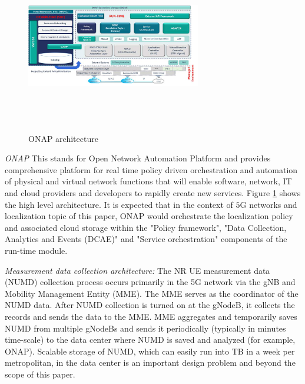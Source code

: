 \documentclass[conference, 10pt]{IEEEtran}
\begin{document}
\begin{figure}[t]
\begin{center}
\includegraphics[height=3.0in,width=3.0in]{./ONAP-architecture.png}
\caption{\label{fig:onap_arch}
{\small ONAP architecture}}
\end{center}
\end{figure}



{\em ONAP} This stands for Open Network Automation Platform and provides comprehensive platform for real time policy driven orchestration and automation of physical and virtual network functions that will enable software, network,
IT and cloud providers and developers to rapidly create new services. Figure \ref{fig:onap_arch} shows the high level architecture. It is expected that in the context of $5$G networks and localization topic of this paper, ONAP would orchestrate the localization policy and associated cloud storage within the "Policy framework", "Data Collection, Analytics and Events (DCAE)" and "Service orchestration" components of the run-time module. 

{\em Measurement data collection architecture:} The NR UE measurement data (NUMD) collection process occurs primarily in the 5G network via the gNB and Mobility Management Entity (MME). The MME serves as the coordinator of the NUMD data.
After NUMD collection is turned on at the gNodeB, it collects the records and sends
the data to the MME. MME aggregates and temporarily saves NUMD from multiple
gNodeBs and sends it periodically (typically in minutes time-scale) to the data
center  where NUMD is saved and analyzed (for example, ONAP). Scalable storage of NUMD, which can easily
run into TB in a week per metropolitan, in the data center is an important design
problem and beyond the scope of this paper.
\end{document}
